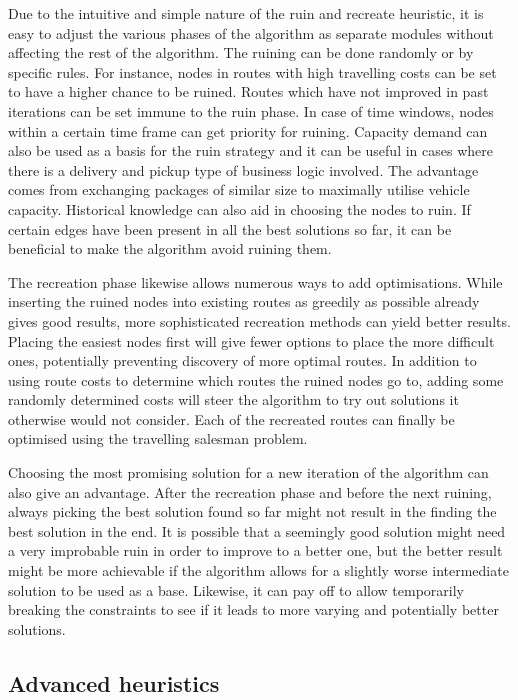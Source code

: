 Due to the intuitive and simple nature of the ruin and recreate heuristic, it is easy to adjust the various phases of the algorithm as separate modules without affecting the rest of the algorithm. The ruining can be done randomly or by specific rules. For instance, nodes in routes with high travelling costs can be set to have a higher chance to be ruined. Routes which have not improved in past iterations can be set immune to the ruin phase. In case of time windows, nodes within a certain time frame can get priority for ruining. Capacity demand can also be used as a basis for the ruin strategy and it can be useful in cases where there is a delivery and pickup type of business logic involved. The advantage comes from exchanging packages of similar size to maximally utilise vehicle capacity. Historical knowledge can also aid in choosing the nodes to ruin. If certain edges have been present in all the best solutions so far, it can be beneficial to make the algorithm avoid ruining them. \cite{pisinger2007general}

The recreation phase likewise allows numerous ways to add optimisations. While inserting the ruined nodes into existing routes as greedily as possible already gives good results, more sophisticated recreation methods can yield better results. Placing the easiest nodes first will give fewer options to place the more difficult ones, potentially preventing discovery of more optimal routes. In addition to using route costs to determine which routes the ruined nodes go to, adding some randomly determined costs will steer the algorithm to try out solutions it otherwise would not consider. Each of the recreated routes can finally be optimised using the travelling salesman problem. \cite{pisinger2007general}  

Choosing the most promising solution for a new iteration of the algorithm can also give an advantage. After the recreation phase and before the next ruining, always picking the best solution found so far might not result in the finding the best solution in the end. It is possible that a seemingly good solution might need a very improbable ruin in order to improve to a better one, but the better result might be more achievable if the algorithm allows for a slightly worse intermediate solution to be used as a base. Likewise, it can pay off to allow temporarily breaking the constraints to see if it leads to more varying and potentially better solutions. \cite{schrimpf2000record}    



\subsection{Advanced heuristics}

